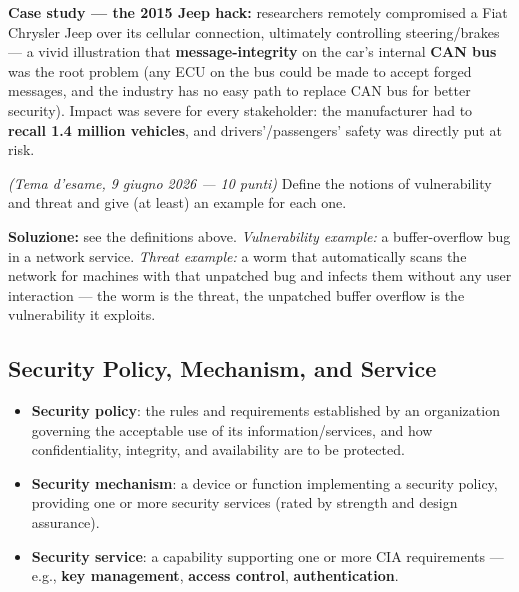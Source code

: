 \documentclass[12pt, a4paper]{article}
\newcounter{esercizio}[section]
\begin{document}
\textbf{Case study — the 2015 Jeep hack:} researchers remotely compromised a Fiat Chrysler Jeep over its cellular connection, ultimately controlling steering/brakes — a vivid illustration that \textbf{message-integrity} on the car's internal \textbf{CAN bus} was the root problem (any ECU on the bus could be made to accept forged messages, and the industry has no easy path to replace CAN bus for better security). Impact was severe for every stakeholder: the manufacturer had to \textbf{recall 1.4 million vehicles}, and drivers'/passengers' safety was directly put at risk.

\begin{tcolorbox}[colback=lightergray!10, colframe=tocsec, title=\textbf{Esercizio \theesercizio}]
\textit{(Tema d'esame, 9 giugno 2026 — 10 punti)} Define the notions of vulnerability and threat and give (at least) an example for each one.
\end{tcolorbox}

\textbf{Soluzione:} see the definitions above. \emph{Vulnerability example:} a buffer-overflow bug in a network service. \emph{Threat example:} a worm that automatically scans the network for machines with that unpatched bug and infects them without any user interaction — the worm is the threat, the unpatched buffer overflow is the vulnerability it exploits.

\subsection{Security Policy, Mechanism, and Service}

\begin{itemize}
    \item \textbf{Security policy}: the rules and requirements established by an organization governing the acceptable use of its information/services, and how confidentiality, integrity, and availability are to be protected.
    \item \textbf{Security mechanism}: a device or function implementing a security policy, providing one or more security services (rated by strength and design assurance).
    \item \textbf{Security service}: a capability supporting one or more CIA requirements — e.g., \textbf{key management}, \textbf{access control}, \textbf{authentication}.
\end{itemize}
\end{document}
